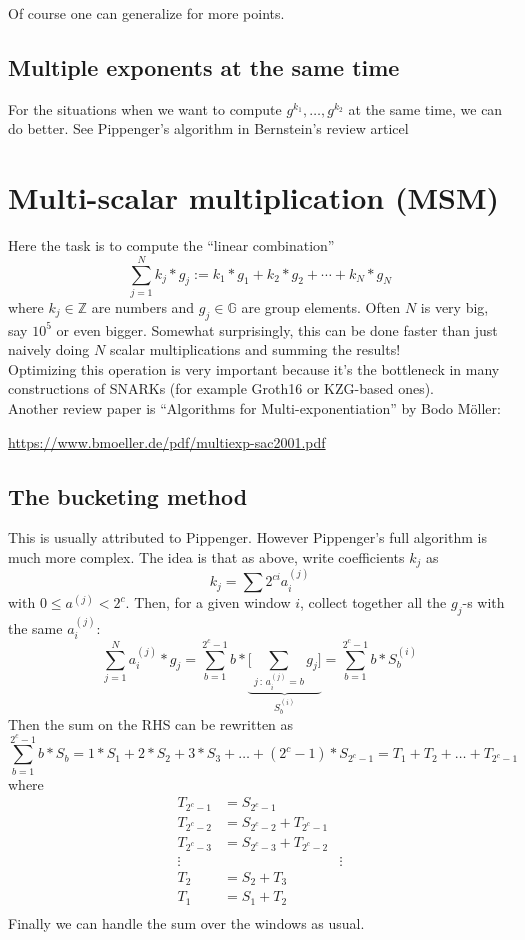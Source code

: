 \documentclass[12pt,draft,a4paper,openany,oneside]{amsbook}
\def\G{\mathbb{G}}
\def\Z{\mathbb{Z}}
\theoremstyle{plain}
\theoremstyle{definition}
\begin{document}
Of course one can generalize for more points.


\subsection{Multiple exponents at the same time}
For the situations when we want to compute $g^{k_1},\dots, g^{k_2}$ at the same
time, we can do better. See Pippenger's algorithm in Bernstein's review articel 


\section{Multi-scalar multiplication (MSM)}

Here the task is to compute the ``linear combination''
\[ \sum_{j=1}^N k_j*g_j := k_1 * g_1 + k_2 * g_2 + \cdots + k_N * g_N \]
where $k_j\in\Z$ are numbers and $g_j\in\G$ are group elements.
Often $N$ is very big, say $10^5$ or even bigger.
Somewhat surprisingly, this can be done faster than just naively doing $N$
scalar multiplications and summing the results!\\

Optimizing this operation is very important because it's the bottleneck
in many constructions of SNARKs (for example Groth16 or KZG-based ones).\\

Another review paper is ``Algorithms for Multi-exponentiation'' by Bodo M\"oller:

\noindent
\url{https://www.bmoeller.de/pdf/multiexp-sac2001.pdf}

\subsection{The bucketing method}
This is usually attributed to Pippenger. However Pippenger's full algorithm
is much more complex. 
The idea is that as above, write coefficients $k_j$ as
\[ k_j = \sum 2^{ci} a^{(j)}_i \]
with $0 \le a^{(j)} < 2^c$.
Then, for a given window $i$, collect together all the $g_j$-s with the same
$a^{(j)}_i$:
\[ \sum_{j=1}^N a^{(j)}_i * g_j = \sum_{b=1}^{2^c-1} b * 
\underbrace{ \bigg[\sum_{j\,:\,a^{(j)}_i=b} g_j \bigg]}_{S^{(i)}_b}  = \sum_{b=1}^{2^c-1} b * S^{(i)}_b
\]
Then the sum on the RHS can be rewritten as 
\[ \sum_{b=1}^{2^c-1} b * S_b = 1*S_1 + 2*S_2 + 3*S_3 + \dots + (2^c-1)*S_{2^c-1} =
T_1 + T_2 + \dots + T_{2^c-1} \]
where 
\begin{align*}
T_{2^c-1} &= S_{2^c-1}  \\
T_{2^c-2} &= S_{2^c-2} + T_{2^c-1}  \\
T_{2^c-3} &= S_{2^c-3} + T_{2^c-2}  \\
\vdots & & \vdots \\
T_{2} &= S_{2} + T_{3}  \\
T_{1} &= S_{1} + T_{2}  \\
\end{align*}
Finally we can handle the sum over the windows as usual.\\
\end{document}
